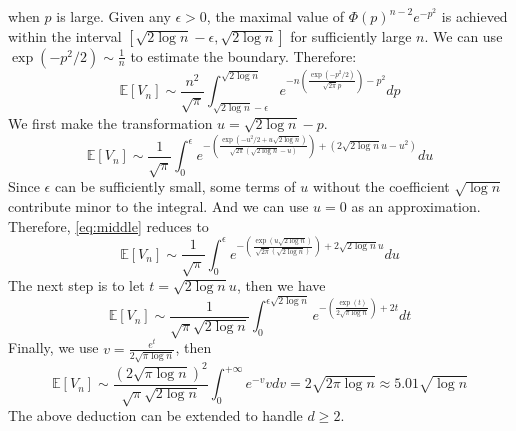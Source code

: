 \documentclass{article}
\def\E{\mathbb{E}}
\begin{document}
when $p$ is large.
Given any $\epsilon>0$, the maximal value of $\Phi(p)^{n-2}e^{-p^2}$
is achieved within the interval $[\sqrt{2\log n} - \epsilon, \sqrt{2\log n}]$
for sufficiently large $n$. We can use $\exp(-p^2/2) \sim \frac{1}{n}$
to estimate the boundary.
Therefore:
\begin{equation*}
    \E[V_n] \sim \frac{n^2}{\sqrt{\pi}}
    \int_{\sqrt{2\log n} - \epsilon}^{\sqrt{2\log n}}
    e^{-n\left(\frac{\exp(-p^2/2)}{\sqrt{2\pi}p}\right)-p^2}dp
\end{equation*}
We first make the transformation $u=\sqrt{2\log n} - p$.
\begin{equation}\label{eq:middle}
    \E[V_n] \sim \frac{1}{\sqrt{\pi}}
    \int_{0}^{\epsilon}
    e^{-\left(\frac{\exp(-u^2/2+u\sqrt{2\log n})}{\sqrt{2\pi}(\sqrt{2\log n}-u)}\right)+(2\sqrt{2\log n}u-u^2)}du
\end{equation}
Since $\epsilon $ can be sufficiently small, some terms of $u$
without the coefficient $\sqrt{\log n}$ contribute minor to the integral.
And we can use $u=0$ as an approximation. Therefore,
\eqref{eq:middle} reduces to
\begin{equation*}
    \E[V_n] \sim \frac{1}{\sqrt{\pi}}
    \int_{0}^{\epsilon}
    e^{-\left(\frac{\exp(u\sqrt{2\log n})}{\sqrt{2\pi}(\sqrt{2\log n})}\right)+2\sqrt{2\log n}u}du
\end{equation*}
The next step is to let $t=\sqrt{2\log n} u$, then we have
\begin{equation*}
    \E[V_n] \sim \frac{1}{\sqrt{\pi} \sqrt{2\log n}}
    \int_{0}^{\epsilon \sqrt{2\log n}}
    e^{-\left(\frac{\exp(t)}{2\sqrt{\pi\log n}}\right)+2t}dt
\end{equation*}
Finally, we use $v=\frac{e^t}{2\sqrt{\pi \log n}}$,
then
\begin{equation*}
    \E[V_n] \sim \frac{(2\sqrt{\pi \log n})^2}{\sqrt{\pi} \sqrt{2\log n}}
    \int_{0}^{+\infty}
    e^{-v}vdv = 2\sqrt{2\pi \log n} \approx 5.01 \sqrt{\log n}
\end{equation*}
The above deduction can be extended to handle $d\geq 2$.
\end{document}
